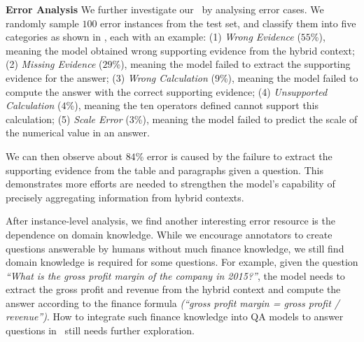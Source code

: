 \noindent \textbf{Error Analysis}
We further investigate our \tagop~by analysing error cases. 
We randomly sample $100$ error instances from the test set, and classify them into five categories as shown in , each with an example:
(1) \emph{Wrong Evidence} ($55$\%), meaning the model obtained wrong supporting evidence from the hybrid context;
(2) \emph{Missing Evidence} ($29$\%), meaning the model failed to extract the supporting evidence for the answer;
(3) \emph{Wrong Calculation} ($9$\%), meaning the model failed to compute the answer with the correct supporting evidence;
(4) \emph{Unsupported Calculation} ($4$\%), meaning the ten operators defined cannot support this calculation;
(5) \emph{Scale Error} ($3$\%), meaning the model failed to predict the scale of the numerical value in an answer.

We can then observe about $84$\% error is caused by the failure to extract the supporting evidence from the table and paragraphs given a question.
This demonstrates more efforts are needed to strengthen the model's capability of precisely aggregating information from hybrid contexts.


After instance-level analysis, we find another interesting error resource is the dependence on domain knowledge. 
While we encourage annotators to create questions answerable by humans without much finance knowledge, we still find domain knowledge is required for some questions.
For example, given the question \emph{``What is the gross profit margin of the company in 2015?''},  the model needs to extract the gross profit and revenue from the hybrid context and compute the answer according to the finance formula \emph{(``gross profit margin = gross profit / revenue'')}. 
How to integrate such finance knowledge into QA models to answer questions in \finqa~still needs further exploration.

